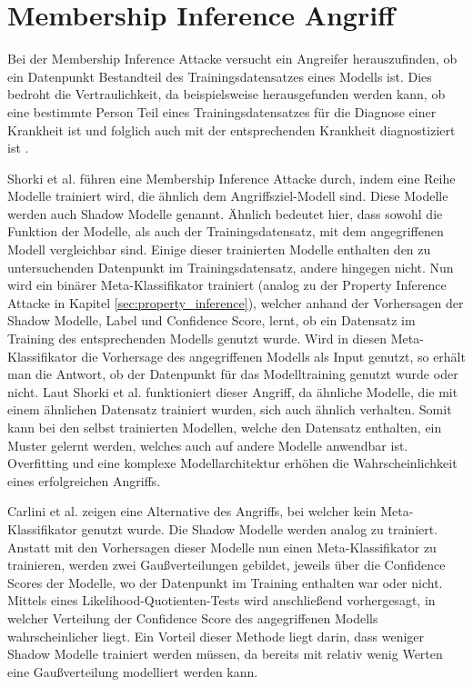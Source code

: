 \section{Membership Inference Angriff}\label{sec:membership_inference}

Bei der Membership Inference Attacke versucht ein Angreifer herauszufinden, ob ein Datenpunkt Bestandteil des Trainingsdatensatzes eines Modells ist. 
Dies bedroht die Vertraulichkeit, da beispielsweise herausgefunden werden kann, ob eine bestimmte Person Teil eines Trainingsdatensatzes für die Diagnose einer Krankheit ist und folglich auch mit der entsprechenden Krankheit diagnostiziert ist \cite{P-2}.

Shorki et al. \cite{P-2} führen eine Membership Inference Attacke durch, indem eine Reihe Modelle trainiert wird, die ähnlich dem Angriffsziel-Modell sind.
Diese Modelle werden auch Shadow Modelle genannt.
Ähnlich bedeutet hier, dass sowohl die Funktion der Modelle, als auch der Trainingsdatensatz, mit dem angegriffenen Modell vergleichbar sind.
Einige dieser trainierten Modelle enthalten den zu untersuchenden Datenpunkt im Trainingsdatensatz, andere hingegen nicht.
Nun wird ein binärer Meta-Klassifikator trainiert (analog zu der Property Inference Attacke in Kapitel \ref{sec:property_inference}), welcher anhand der Vorhersagen der Shadow Modelle, Label und Confidence Score, lernt, ob ein Datensatz im Training des entsprechenden Modells genutzt wurde.
Wird in diesen Meta-Klassifikator die Vorhersage des angegriffenen Modells als Input genutzt, so erhält man die Antwort, ob der Datenpunkt für das Modelltraining genutzt wurde oder nicht.
Laut Shorki et al. \cite{P-2} funktioniert dieser Angriff, da ähnliche Modelle, die mit einem ähnlichen Datensatz trainiert wurden, sich auch ähnlich verhalten. 
Somit kann bei den selbst trainierten Modellen, welche den Datensatz enthalten, ein Muster gelernt werden, welches auch auf andere Modelle anwendbar ist. 
Overfitting und eine komplexe Modellarchitektur erhöhen die Wahrscheinlichkeit eines erfolgreichen Angriffs.

Carlini et al. \cite{P-13} zeigen eine Alternative des Angriffs, bei welcher kein Meta-Klassifikator genutzt wurde.
Die Shadow Modelle werden analog zu \cite{P-2} trainiert. 
Anstatt mit den Vorhersagen dieser Modelle nun einen Meta-Klassifikator zu trainieren, werden zwei Gaußverteilungen gebildet, jeweils über die Confidence Scores der Modelle, wo der Datenpunkt im Training enthalten war oder nicht.
Mittels eines Likelihood-Quotienten-Tests wird anschließend vorhergesagt, in welcher Verteilung der Confidence Score des angegriffenen Modells wahrscheinlicher liegt.
Ein Vorteil dieser Methode liegt darin, dass weniger Shadow Modelle trainiert werden müssen, da bereits mit relativ wenig Werten eine Gaußverteilung modelliert werden kann.


